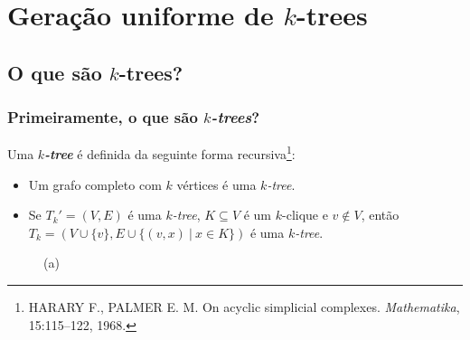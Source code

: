 \documentclass{beamer}
\begin{document}
  \section{Geração uniforme de $k$-trees}

  \subsection{O que são $k$-trees?}

  \begin{frame}
    \frametitle{Primeiramente, o que são \emph{$k$-trees}?}

    Uma \textbf{\emph{$k$-tree}} é definida da seguinte forma recursiva\footnote{\scriptsize HARARY F., PALMER E. M. On acyclic simplicial complexes. \emph{Mathematika}, 15:115--122, 1968.}:

    \begin{itemize}
      \item Um grafo completo com $k$ vértices é uma \emph{$k$-tree}.
      \item Se $T_k' = (V, E)$ é uma \emph{$k$-tree}, $K \subseteq V$ é um $k$-clique e $v \not \in V$, então $T_k = (V \cup \{v\}, E \cup \{(v,x) \ | \  x \in K\})$ é uma \emph{$k$-tree}.
    \end{itemize}

    \begin{figure}
      \begin{minipage}{0.3333\textwidth}
        \centering

        (a)
      \end{minipage}\begin{minipage}{0.3333\textwidth}
        \centering
\end{minipage}
\end{figure}
\end{frame}
\end{document}
